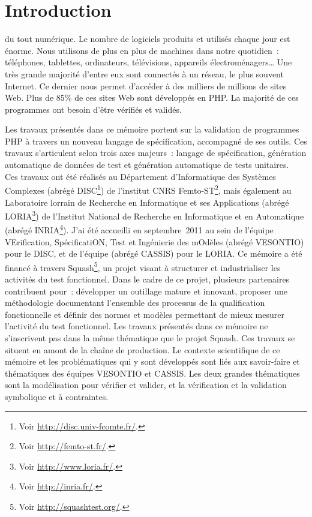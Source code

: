 \chapter{Introduction}
\label{chapter:introduction}

\mminitoc

 du tout numérique. Le nombre de logiciels produits et utilisés
chaque jour est énorme. Nous utilisons de plus en plus de machines dans notre
quotidien~: téléphones, tablettes, ordinateurs, télévisions, appareils
électroménagers… Une très grande majorité d'entre eux sont connectés à un
réseau, le plus souvent Internet. Ce dernier nous permet d'accéder à des
milliers de millions de sites Web. Plus de 85\% de ces sites Web sont développés
en PHP. La majorité de ces programmes ont besoin d'être vérifiés et validés.

Les travaux présentés dans ce mémoire portent sur la validation de programmes
PHP à travers un nouveau langage de spécification, accompagné de ses outils. Ces
travaux s'articulent selon trois axes majeurs~: langage de spécification,
génération automatique de données de test et génération automatique de tests
unitaires. \\

Ces travaux ont été réalisés au Département d'Informatique des Systèmes
Complexes (abrégé DISC\footnote{Voir \url{http://disc.univ-fcomte.fr/}.}) de
l'institut CNRS Femto-ST\footnote{Voir \url{http://femto-st.fr/}.}, mais
également au Laboratoire lorrain de Recherche en Informatique et ses
Applications (abrégé LORIA\footnote{Voir \url{http://www.loria.fr/}.}) de
l'Institut National de Recherche en Informatique et en Automatique (abrégé
INRIA\footnote{Voir \url{http://inria.fr/}.}). J'ai été accueilli en
septembre~2011 au sein de l'équipe VErification, SpécificatiON, Test et
Ingénierie des mOdèles (abrégé VESONTIO) pour le DISC, et de l'équipe
(abrégé CASSIS) pour le LORIA. Ce mémoire a été financé à travers
Squash\footnote{Voir \url{http://squashtest.org/}.}, un projet
 visant à structurer et industrialiser les activités du
test fonctionnel. Dans le cadre de ce projet, plusieurs partenaires contribuent
pour~: développer un outillage  mature et innovant,
proposer une méthodologie  documentant l'ensemble des
processus de la qualification fonctionnelle et définir des normes et modèles
permettant de mieux mesurer l'activité du test fonctionnel. Les travaux
présentés dans ce mémoire ne s'inscrivent pas dans la même thématique que le
projet Squash. Ces travaux se situent en amont de la chaîne de production. Le
contexte scientifique de ce mémoire et les problématiques qui y sont développés
sont liés aux savoir-faire et thématiques des équipes VESONTIO et CASSIS. Les
deux grandes thématiques sont la modélisation pour vérifier et valider, et la
vérification et la validation symbolique et à contraintes. \\

